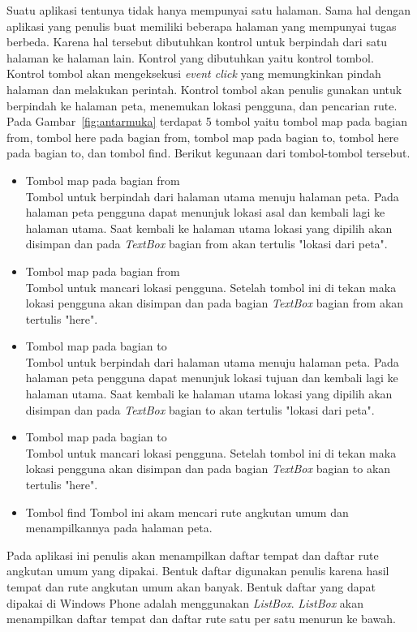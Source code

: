 Suatu aplikasi tentunya tidak hanya mempunyai satu halaman. Sama hal dengan aplikasi yang penulis buat memiliki beberapa halaman yang mempunyai tugas berbeda. Karena hal tersebut dibutuhkan kontrol untuk berpindah dari satu halaman ke halaman lain. Kontrol yang dibutuhkan yaitu kontrol tombol. Kontrol tombol akan mengeksekusi \textit{event click} yang memungkinkan pindah halaman dan melakukan perintah. Kontrol tombol akan penulis gunakan untuk berpindah ke halaman peta, menemukan lokasi pengguna, dan pencarian rute. Pada Gambar~\ref{fig:antarmuka} terdapat 5 tombol yaitu tombol map pada bagian from, tombol here pada bagian from, tombol map pada bagian to, tombol here pada bagian to, dan tombol find. Berikut kegunaan dari tombol-tombol tersebut.
\begin{itemize}
	\item Tombol map pada bagian from\\
	Tombol untuk berpindah dari halaman utama menuju halaman peta. Pada halaman peta pengguna dapat menunjuk lokasi asal dan kembali lagi ke halaman utama. Saat kembali ke halaman utama lokasi yang dipilih akan disimpan dan pada \textit{TextBox} bagian from akan tertulis "lokasi dari peta".
	\item Tombol map pada bagian from\\
	Tombol untuk mancari lokasi pengguna. Setelah tombol ini di tekan maka lokasi pengguna akan disimpan dan pada bagian \textit{TextBox} bagian from akan tertulis "here".
	\item Tombol map pada bagian to\\
	Tombol untuk berpindah dari halaman utama menuju halaman peta. Pada halaman peta pengguna dapat menunjuk lokasi tujuan dan kembali lagi ke halaman utama. Saat kembali ke halaman utama lokasi yang dipilih akan disimpan dan pada \textit{TextBox} bagian to akan tertulis "lokasi dari peta".
	\item Tombol map pada bagian to\\
	Tombol untuk mancari lokasi pengguna. Setelah tombol ini di tekan maka lokasi pengguna akan disimpan dan pada bagian \textit{TextBox} bagian to akan tertulis "here".
	\item Tombol find 
	Tombol ini akam mencari rute angkutan umum dan menampilkannya pada halaman peta.
\end{itemize}

Pada aplikasi ini penulis akan menampilkan daftar tempat dan daftar rute angkutan umum yang dipakai. Bentuk daftar digunakan penulis karena hasil tempat dan rute angkutan umum akan banyak. Bentuk daftar yang dapat dipakai di Windows Phone adalah menggunakan \textit{ListBox}. \textit{ListBox} akan menampilkan daftar tempat dan daftar rute satu per satu menurun ke bawah.

